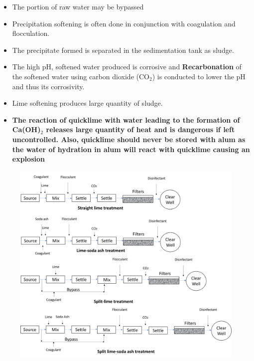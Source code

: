 \begin{itemize}
\begin{enumerate}
\begin{itemize}
\begin{itemize}
\end{itemize}
\item The portion of raw water may be bypassed 
\item Precipitation softening is often done in conjunction with coagulation and flocculation.
\item The precipitate formed is separated in the sedimentation tank as sludge.
\item The high pH, softened water produced is corrosive and \textbf{Recarbonation}  of the softened water using carbon dioxide (CO$_2$) is conducted to lower the pH and thus its corrosivity.  
\item Lime softening produces large quantity of sludge.
\item \textbf{The reaction of quicklime with water leading to the formation of Ca(OH)$_2$ releases large quantity of heat and is dangerous if left uncontrolled.  Also, quicklime should never be stored with alum as the water of hydration in alum will react with quicklime causing an explosion}
\end{itemize}
\end{enumerate}
\end{itemize}

\begin{figure}[]
\begin{center}
\includegraphics[scale=0.48]{PrecipitationSOftening}\\
\label{Precipitation softening}
\end{center}
\end{figure}

